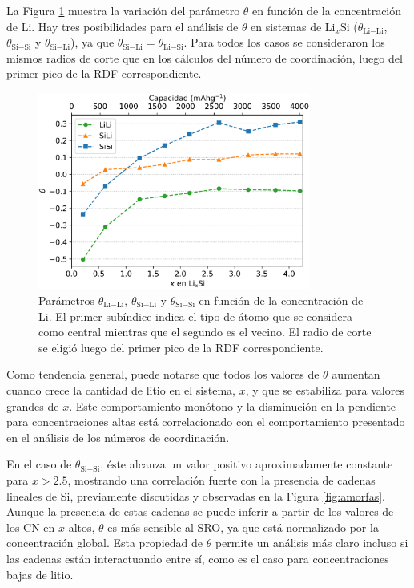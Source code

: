 La Figura \ref{fig:sro} muestra la variación del parámetro $\theta$ en función 
de la concentración de Li. Hay tres posibilidades para el análisis de $\theta$ en
sistemas de Li$_x$Si ($\theta_{\text{Li}-\text{Li}}$, $\theta_{\text{Si}-\text{Si}}$ y $\theta_{\text{Si}-\text{Li}}$), ya
que $\theta_{\text{Si}-\text{Li}} = \theta_{\text{Li}-\text{Si}}$. Para todos los casos se consideraron los
mismos radios de corte que en los cálculos del número de coordinación, luego del
primer pico de la RDF correspondiente.
\begin{figure}[h!]
    \centering
    \includegraphics[width=0.8\textwidth]{Silicio/caracterizacion/resultados/sro/sro.png}
    \caption{Parámetros $\theta_{\text{Li}-\text{Li}}$, $\theta_{\text{Si}-\text{Li}}$ y $\theta_{\text{Si}-\text{Si}}$ 
    en función de la concentración de Li. El primer subíndice indica el tipo de
    átomo que se considera como central mientras que el segundo es el vecino. El
    radio de corte se eligió luego del primer pico de la RDF correspondiente.}
    \label{fig:sro}
\end{figure}

Como tendencia general, puede notarse que todos los valores de $\theta$ aumentan
cuando crece la cantidad de litio en el sistema, $x$, y que se estabiliza para 
valores grandes de $x$. Este comportamiento monótono y la disminución en la 
pendiente para concentraciones altas está correlacionado con el comportamiento
presentado en el análisis de los números de coordinación.

En el caso de $\theta_{\text{Si}-\text{Si}}$, éste alcanza un valor positivo aproximadamente 
constante para $x > 2.5$, mostrando una correlación fuerte con la presencia de 
cadenas lineales de Si, previamente discutidas y observadas en la Figura 
\ref{fig:amorfas}. Aunque la presencia de estas cadenas se puede inferir a partir
de los valores de los CN en $x$ altos, $\theta$ es más sensible al SRO, ya que
está normalizado por la concentración global. Esta propiedad de $\theta$ permite
un análisis más claro incluso si las cadenas están interactuando entre sí, como
es el caso para concentraciones bajas de litio.

